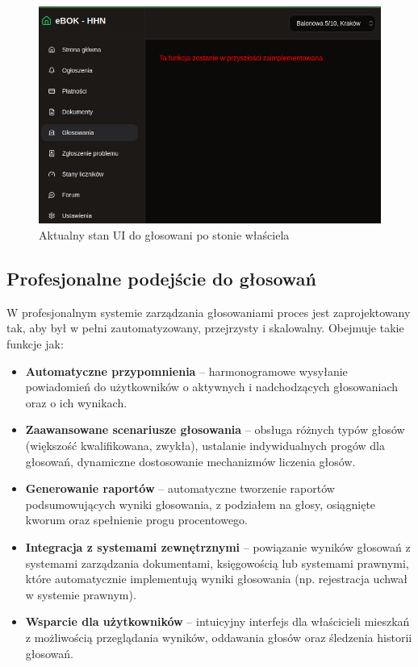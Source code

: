 \begin{figure}[ht]
    \centering
    \includegraphics[width=0.63\linewidth]{rys03/poll_ui_unfinish}
    \caption{Aktualny stan UI do głosowani po stonie właściela}
    \label{fig:poll_owner_ui}
\end{figure}

\subsection{Profesjonalne podejście do głosowań}

W profesjonalnym systemie zarządzania głosowaniami proces jest zaprojektowany tak, aby był w pełni zautomatyzowany, przejrzysty i skalowalny. Obejmuje takie funkcje jak:
\begin{itemize}
    \item \textbf{Automatyczne przypomnienia} -- harmonogramowe wysyłanie powiadomień do użytkowników o aktywnych i nadchodzących głosowaniach oraz o ich wynikach. 
    \item \textbf{Zaawansowane scenariusze głosowania} -- obsługa różnych typów głosów (większość kwalifikowana, zwykła), ustalanie indywidualnych progów dla głosowań, dynamiczne dostosowanie mechanizmów liczenia głosów.
    \item \textbf{Generowanie raportów} -- automatyczne tworzenie raportów podsumowujących wyniki głosowania, z podziałem na głosy, osiągnięte kworum oraz spełnienie progu procentowego.
    \item \textbf{Integracja z systemami zewnętrznymi} -- powiązanie wyników głosowań z systemami zarządzania dokumentami, księgowością lub systemami prawnymi, które automatycznie implementują wyniki głosowania (np. rejestracja uchwał w systemie prawnym).
    \item \textbf{Wsparcie dla użytkowników} -- intuicyjny interfejs dla właścicieli mieszkań z możliwością przeglądania wyników, oddawania głosów oraz śledzenia historii głosowań.
\end{itemize}

